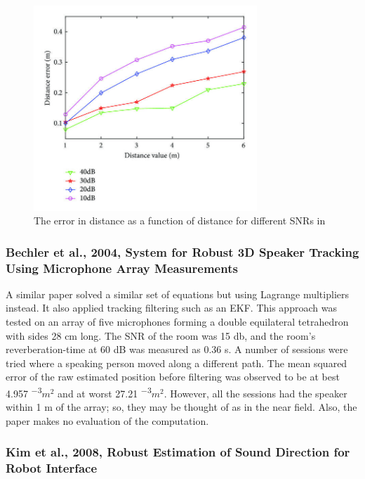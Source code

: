 \documentclass{report}
\newcommand{\e}[1]{\times 10^{#1}}
\begin{document}
\begin{figure}[H]
\includegraphics[width=0.75\textwidth]{./chen_2019/distance_SNR.jpg}
\centering
\caption{The error in distance as a function of distance for different SNRs in \cite{chen_sound_2019}}
\label{fig:chen_2019_distance_SNR}
\centering
\end{figure}

\subsubsection{Bechler et al., 2004, System for Robust 3D Speaker Tracking Using Microphone Array Measurements}

A similar paper \cite{bechler_system_2004} solved a similar set of equations but using Lagrange multipliers instead. It also applied tracking filtering such as an EKF. This approach was tested on an array of five microphones forming a double equilateral tetrahedron with sides 28 \si{cm} long. The SNR of the room was 15 \si{db}, and the room's reverberation-time at 60 \si{dB} was measured as 0.36 \si{s}. A number of sessions were tried where a speaking person moved along a different path. The mean squared error of the raw estimated position before filtering was observed to be at best 4.957 \si{\e{-3}}{$m^2$} and at worst 27.21 \si{\e{-3}}{$m^2$}. However, all the sessions had the speaker within 1 \si{m} of the array; so, they may be thought of as in the near field. Also, the paper makes no evaluation of the computation.

\subsubsection{Kim et al., 2008, Robust Estimation of Sound Direction for Robot Interface}
\end{document}
